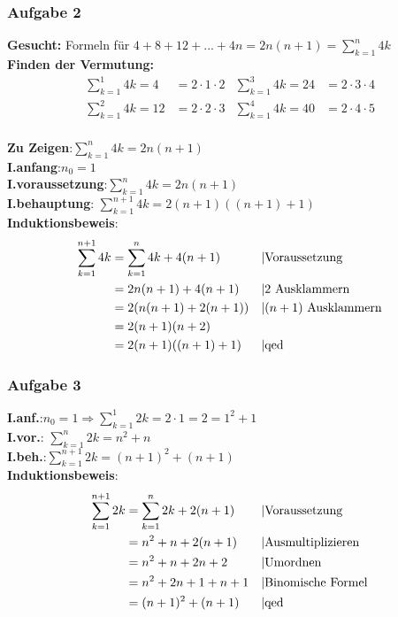 \subsubsection{Aufgabe 2}
\textbf{Gesucht:} Formeln für $ 4 + 8 + 12 + ... + 4n = 2n(n+1) = \sum_{k=1}^n 4k$ \\
\textbf{Finden der Vermutung:}\begin{align*} 	\sum_{k=1}^1 4k = 4  &= 2\cdot1\cdot2 &\sum_{k=1}^3 4k = 24 &= 2\cdot3\cdot4\\
																							\sum_{k=1}^2 4k = 12 &= 2\cdot2\cdot3 &\sum_{k=1}^4 4k = 40 &= 2\cdot4\cdot5 \end{align*}\\
\textbf{Zu Zeigen}:\quad$\sum_{k=1}^n 4k = 2n(n+1) $ \\
\textbf{I.anfang}:\quad$ n_0 = 1$ \\
\textbf{I.voraussetzung}:\quad$\sum_{k=1}^n 4k = 2n(n+1) $\\
\textbf{I.behauptung}: \quad $\sum_{k=1}^{n+1} 4k = 2(n+1)((n+1)+1) $\\
\textbf{Induktionsbeweis}: \begin{align*}
	\sum_{k=1}^{n+1} 4k &= \sum_{k=1}^n 4k + 4(n+1)	&& \text{\textbar Voraussetzung}\\
											&= 2n(n+1) + 4(n+1)					&& \text{\textbar $2$ Ausklammern}\\
											&= 2(n(n+1)+2(n+1))					&& \text{\textbar $(n+1)$ Ausklammern}\\
											&= 2(n+1)(n+2)							&& \\
											&= 2(n+1)((n+1)+1)				&& \text{\textbar qed}\end{align*}
\subsubsection{Aufgabe 3}
\textbf{I.anf.}:\quad$ n_0 = 1 \Rightarrow \sum_{k=1}^1 2k = 2\cdot1 = 2 = 1^2+1$ \\
\textbf{I.vor.}: \quad$\sum_{k=1}^{n} 2k = n^2 + n $\\
\textbf{I.beh.}:\quad$\sum_{k=1}^{n+1} 2k = (n+1)^2 + (n+1) $\\
\textbf{Induktionsbeweis}:  \begin{align*} 
		\sum_{k=1}^{n+1} 2k 	&= \sum_{k=1}^{n} 2k + 2(n+1) && \text{\textbar Voraussetzung}\\
													&= n^2 + n + 2(n+1) 					&& \text{\textbar Ausmultiplizieren}\\
													&= n^2 + n + 2n + 2						&& \text{\textbar Umordnen}\\
													&= n^2 + 2n + 1 + n+1 				&& \text{\textbar Binomische Formel}\\
													&= (n+1)^2 + (n+1) 						&& \text{\textbar qed}\end{align*}
